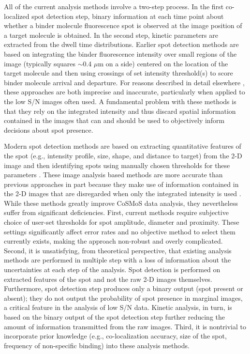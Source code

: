 All of the current analysis methods involve a two-step process. In the first co-localized spot detection step, binary information at each time point about whether a binder molecule fluorescence spot is observed at the image position of a target molecule is obtained. In the second step, kinetic parameters are extracted from the dwell time distributions. Earlier spot detection methods are based on integrating the binder fluorescence intensity over small regions of the image (typically squares $\sim$0.4 $\mu$m on a side) centered on the location of the target molecule and then using crossings of set intensity threshold(s) to score binder molecule arrival and departure. For reasons described in detail elsewhere \citep{Friedman2015-nx}, these approaches are both imprecise and inaccurate, particularly when applied to the low S/N images often used. A fundamental problem with these methods is that they rely on the integrated intensity and thus discard spatial information contained in the images that can and should be used to objectively inform decisions about spot presence.

Modern spot detection methods are based on extracting quantitative features of the spot (e.g., intensity profile, size, shape, and distance to target) from the 2-D image and then identifying spots using manually chosen thresholds for these parameters \citep{Friedman2015-nx, Smith2019-yb}. These image analysis based methods are more accurate than previous approaches in part because they make use of information contained in the 2-D images that are disregarded when only the integrated intensity is used \citep{Friedman2015-nx}. While these methods greatly improve CoSMoS data analysis, they nevertheless suffer from significant deficiencies. First, current methods require subjective choice of user-set thresholds for spot amplitude, diameter and proximity. These settings significantly affect error rates and no objective method to select them currently exists, making the approach non-robust and overly complicated. Second, it is unsatisfying, from theoretical perspective, that existing analysis methods are performed in multiple step with a loss of information about the uncertainties at each step of the analysis. Spot detection is performed on extracted features of the spot and not the raw 2-D images themselves. Furthermore, spot detection step produces only a binary output (spot present or absent); they do not output the probability of spot presence in marginal images, a critical feature in the analysis of low S/N data. Kinetic analysis, in turn, is based on the binary output of the spot detection step further reducing the amount of information transmitted from the raw images. Third, it is nontrivial to incorporate prior knowledge (e.g., co-localization accuracy, size of the spot, frequency of non-specific binding) into these analysis methods.

